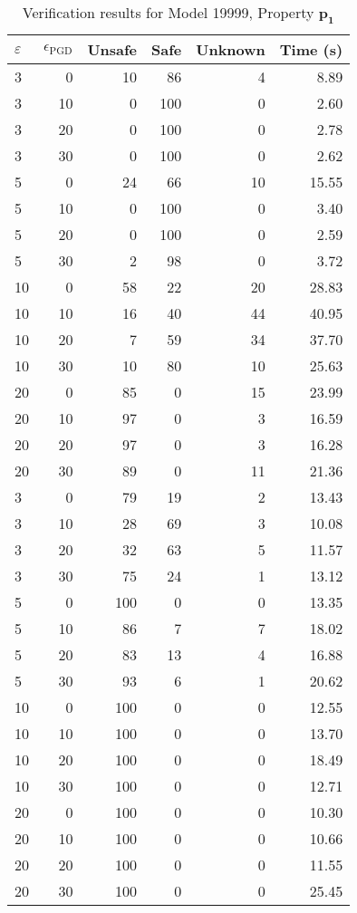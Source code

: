 \begin{table}[htbp]
\centering
\caption{Verification results for Model 19999, Property $\mathbf{p_{1}}$}
\label{tab:model19999_r1_part7}
\begin{tabular}{lrrrrr}
\toprule
$\varepsilon$ & $\epsilon_{\scriptscriptstyle\mathrm{PGD}}$ & Unsafe & Safe & Unknown & Time (s) \\
\midrule
3 & 0 & 10 & 86 & 4 & 8.89 \\
3 & 10 & 0 & 100 & 0 & 2.60 \\
3 & 20 & 0 & 100 & 0 & 2.78 \\
3 & 30 & 0 & 100 & 0 & 2.62 \\
5 & 0 & 24 & 66 & 10 & 15.55 \\
5 & 10 & 0 & 100 & 0 & 3.40 \\
5 & 20 & 0 & 100 & 0 & 2.59 \\
5 & 30 & 2 & 98 & 0 & 3.72 \\
10 & 0 & 58 & 22 & 20 & 28.83 \\
10 & 10 & 16 & 40 & 44 & 40.95 \\
10 & 20 & 7 & 59 & 34 & 37.70 \\
10 & 30 & 10 & 80 & 10 & 25.63 \\
20 & 0 & 85 & 0 & 15 & 23.99 \\
20 & 10 & 97 & 0 & 3 & 16.59 \\
20 & 20 & 97 & 0 & 3 & 16.28 \\
20 & 30 & 89 & 0 & 11 & 21.36 \\
3 & 0 & 79 & 19 & 2 & 13.43 \\
3 & 10 & 28 & 69 & 3 & 10.08 \\
3 & 20 & 32 & 63 & 5 & 11.57 \\
3 & 30 & 75 & 24 & 1 & 13.12 \\
5 & 0 & 100 & 0 & 0 & 13.35 \\
5 & 10 & 86 & 7 & 7 & 18.02 \\
5 & 20 & 83 & 13 & 4 & 16.88 \\
5 & 30 & 93 & 6 & 1 & 20.62 \\
10 & 0 & 100 & 0 & 0 & 12.55 \\
10 & 10 & 100 & 0 & 0 & 13.70 \\
10 & 20 & 100 & 0 & 0 & 18.49 \\
10 & 30 & 100 & 0 & 0 & 12.71 \\
20 & 0 & 100 & 0 & 0 & 10.30 \\
20 & 10 & 100 & 0 & 0 & 10.66 \\
20 & 20 & 100 & 0 & 0 & 11.55 \\
20 & 30 & 100 & 0 & 0 & 25.45 \\
\bottomrule
\end{tabular}
\end{table}
